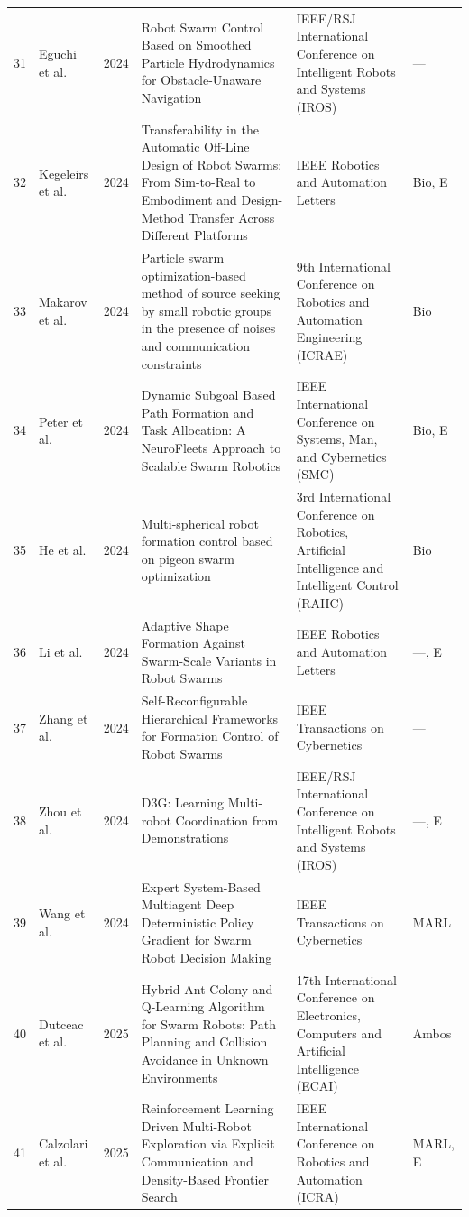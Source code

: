 \begin{longtable}{@{}r>{\raggedright\arraybackslash}p{2.3cm}r>{\raggedright\arraybackslash}p{5.4cm}>{\raggedright\arraybackslash}p{3.0cm}p{1.4cm}@{}}
31 & Eguchi et al. & 2024 & Robot Swarm Control Based on Smoothed Particle Hydrodynamics for Obstacle-Unaware Navigation & 2024 IEEE/RSJ International Conference on Intelligent Robots and Systems (IROS) & --- \\
32 & Kegeleirs et al. & 2024 & Transferability in the Automatic Off-Line Design of Robot Swarms: From Sim-to-Real to Embodiment and Design-Method Transfer Across Different Platforms & IEEE Robotics and Automation Letters & Bio, E \\
33 & Makarov et al. & 2024 & Particle swarm optimization-based method of source seeking by small robotic groups in the presence of noises and communication constraints & 2024 9th International Conference on Robotics and Automation Engineering (ICRAE) & Bio \\
34 & Peter et al. & 2024 & Dynamic Subgoal Based Path Formation and Task Allocation: A NeuroFleets Approach to Scalable Swarm Robotics & 2024 IEEE International Conference on Systems, Man, and Cybernetics (SMC) & Bio, E \\
35 & He et al. & 2024 & Multi-spherical robot formation control based on pigeon swarm optimization & 2024 3rd International Conference on Robotics, Artificial Intelligence and Intelligent Control (RAIIC) & Bio \\
36 & Li et al. & 2024 & Adaptive Shape Formation Against Swarm-Scale Variants in Robot Swarms & IEEE Robotics and Automation Letters & ---, E \\
37 & Zhang et al. & 2024 & Self-Reconfigurable Hierarchical Frameworks for Formation Control of Robot Swarms & IEEE Transactions on Cybernetics & --- \\
38 & Zhou et al. & 2024 & D3G: Learning Multi-robot Coordination from Demonstrations & 2024 IEEE/RSJ International Conference on Intelligent Robots and Systems (IROS) & ---, E \\
39 & Wang et al. & 2024 & Expert System-Based Multiagent Deep Deterministic Policy Gradient for Swarm Robot Decision Making & IEEE Transactions on Cybernetics & MARL \\
40 & Dutceac et al. & 2025 & Hybrid Ant Colony and Q-Learning Algorithm for Swarm Robots: Path Planning and Collision Avoidance in Unknown Environments & 2025 17th International Conference on Electronics, Computers and Artificial Intelligence (ECAI) & Ambos \\
41 & Calzolari et al. & 2025 & Reinforcement Learning Driven Multi-Robot Exploration via Explicit Communication and Density-Based Frontier Search & 2025 IEEE International Conference on Robotics and Automation (ICRA) & MARL, E \\

\end{longtable}
